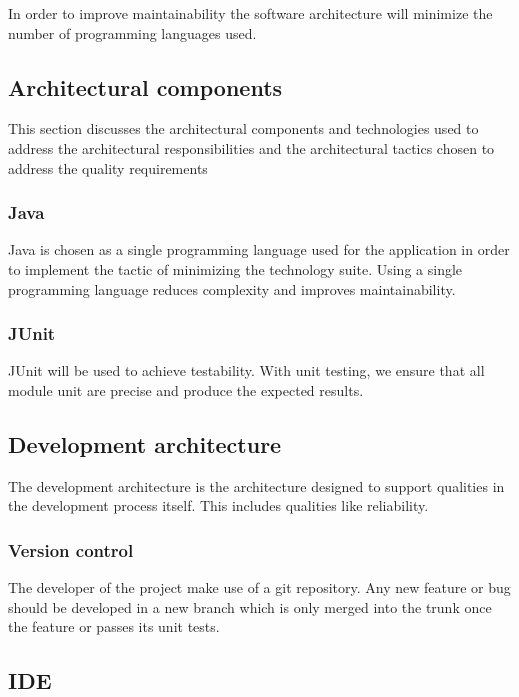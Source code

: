 In order to improve maintainability the software architecture will minimize the number of programming languages  used.

\subsection{Architectural components}

This section discusses the architectural components and technologies used to address
the architectural responsibilities and the architectural tactics chosen to address the quality requirements

\subsubsection{Java}

Java is chosen as a single programming language used for the application in order to implement the tactic of minimizing the technology suite.  Using a single programming language reduces complexity and improves maintainability.

\subsubsection{JUnit}

JUnit will be used to achieve testability. With unit testing, we ensure that all module unit are precise and produce the expected results.

\subsection{Development architecture}

The development architecture is the architecture designed to support qualities in the development process itself. This
includes qualities like reliability.

\subsubsection{Version control}

The developer of the project make use of a git repository. Any new feature or bug should be developed in a new branch which is only merged into the trunk once the feature or passes its unit tests.

\subsection{IDE}

